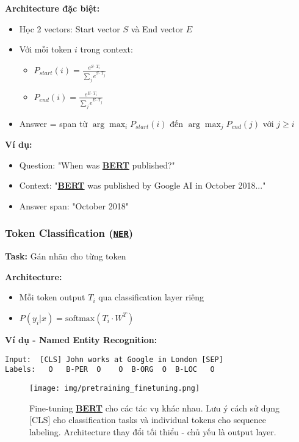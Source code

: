 \textbf{Architecture đặc biệt:}
\begin{itemize}
    \item Học 2 vectors: Start vector $S$ và End vector $E$
    \item Với mỗi token $i$ trong context:
    \begin{itemize}
        \item $P_{start}(i) = \frac{e^{S \cdot T_i}}{\sum_j e^{S \cdot T_j}}$
        \item $P_{end}(i) = \frac{e^{E \cdot T_i}}{\sum_j e^{E \cdot T_j}}$
    \end{itemize}
    \item Answer = span từ $\arg\max_i P_{start}(i)$
    đến $\arg\max_j P_{end}(j)$ với $j \geq i$
\end{itemize}

\textbf{Ví dụ:}
\begin{itemize}
    \item Question: "When was \hyperref[acro:bert]{\textbf{BERT}} published?"
    \item Context: "\hyperref[acro:bert]{\textbf{BERT}} was published by Google AI in October 2018..."
    \item Answer span: "October 2018"
\end{itemize}

\subsubsection{Token Classification (\hyperref[acro:ner]{\texttt{NER}})}
\textbf{Task:} Gán nhãn cho từng token

\textbf{Architecture:}
\begin{itemize}
    \item Mỗi token output $T_i$ qua classification layer riêng
    \item $P(y_i|x) = \text{softmax}(T_i \cdot W^T)$
\end{itemize}

\textbf{Ví dụ - Named Entity Recognition:}
\begin{verbatim}
Input:  [CLS] John works at Google in London [SEP]
Labels:   O   B-PER  O    O  B-ORG  O  B-LOC   O
\end{verbatim}

\begin{figure}[H]
    \centering
    \texttt{[image: img/pretraining\_finetuning.png]}
    \caption{Fine-tuning \hyperref[acro:bert]{\textbf{BERT}} cho các tác vụ khác
    nhau. Lưu ý cách sử dụng [CLS] cho classification tasks và individual tokens cho sequence labeling.
    Architecture thay đổi tối thiểu - chủ yếu là output layer.}
    \label{fig:bert_finetuning_tasks}
\end{figure}

